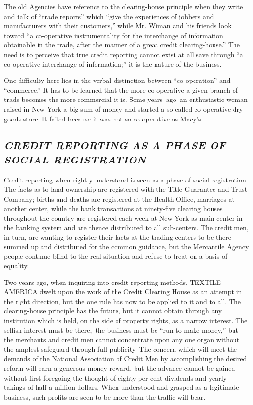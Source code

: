 \documentclass[twoside,symmetric,nobib,justified]{tufte-book}
\begin{document}
The old Agencies have reference to the clearing-house principle when
they write and talk of ``trade reports'' which ``give the experiences of
jobbers and manufacturers with their customers,'' while Mr. Wiman and
his friends look toward ``a co-operative instrumentality for the
interchange of information obtainable in the trade, after the manner of
a great credit clearing-house.'' The need is to perceive that true
credit reporting cannot exist at all save through ``a co-operative
interchange of information;'' it is the nature of the business.~

One difficulty here lies in the verbal distinction between
``co-operation'' and ``commerce.'' It has to be learned that the more
co-operative a given branch of trade becomes the more commercial it is.
Some years~ago~an enthusiastic woman raised in New York a big sum of
money and started a so-called co-operative dry goods store. It failed
because it was not so co-operative as Macy's.~

\enlargethispage{\baselineskip}

\hypertarget{credit-reporting-as-a-phase-of-social-registration}{%
\subsection{\texorpdfstring{\emph{CREDIT REPORTING AS A PHASE OF
SOCIAL
REGISTRATION}~}{CREDIT REPORTING AS A PHASE OF SOCIAL REGISTRATION~}}\label{credit-reporting-as-a-phase-of-social-registration}}

Credit reporting when rightly understood is seen as a phase of social
registration. The facts as to land ownership are registered with the
Title Guarantee and Trust Company; births and deaths are registered at
the Health Office, marriages at another center, while the bank
transactions at ninety-five clearing houses throughout the country are
registered each week at New York as main center in the banking system
and are thence distributed to all sub-centers. The credit men, in turn,
are wanting to register their facts at the trading centers to be there
summed up and distributed for the common guidance, but the Mercantile
Agency people continue blind to the real situation and refuse to treat
on a basis of equality.~

Two years ago, when inquiring into credit reporting methods, TEXTILE
AMERICA dwelt upon the work of the Credit Clearing House as an attempt
in the right direction, but the one rule has now to be applied to it and
to all. The clearing-house principle has the future, but it cannot
obtain through any institution which is held, on the side of property
rights, as a narrow interest. The selfish interest must be there,~the
business must be ``run to make money,'' but the merchants and credit men
cannot concentrate upon any one organ without the amplest safeguard
through full publicity. The concern which will meet the demands of the
National Association of Credit Men by accomplishing the desired reform
will earn a generous money reward, but the advance cannot be gained
without first foregoing the thought of eighty per cent dividends and
yearly takings of half a million dollars. When understood and grasped as
a legitimate business, such profits are seen to be more than the traffic
will bear.~
\end{document}

